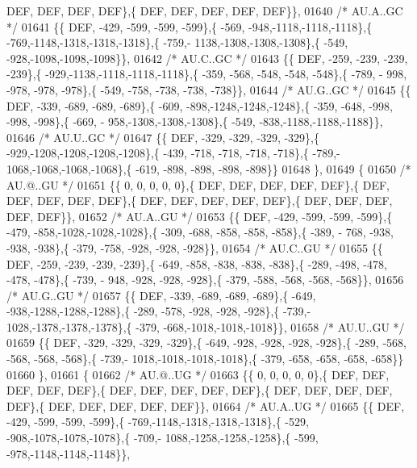 \begin{DoxyCode}
      DEF,  DEF,  DEF,  DEF\},\{  DEF,  DEF,  DEF,  DEF,  DEF\}\},
01640 \textcolor{comment}{/* AU.A..GC */}
01641 \{\{  DEF, -429, -599, -599, -599\},\{ -569, -948,-1118,-1118,-1118\},\{ -769,-1148,-1318,-1318,-1318\},\{ -759,-
      1138,-1308,-1308,-1308\},\{ -549, -928,-1098,-1098,-1098\}\},
01642 \textcolor{comment}{/* AU.C..GC */}
01643 \{\{  DEF, -259, -239, -239, -239\},\{ -929,-1138,-1118,-1118,-1118\},\{ -359, -568, -548, -548, -548\},\{ -789, -
      998, -978, -978, -978\},\{ -549, -758, -738, -738, -738\}\},
01644 \textcolor{comment}{/* AU.G..GC */}
01645 \{\{  DEF, -339, -689, -689, -689\},\{ -609, -898,-1248,-1248,-1248\},\{ -359, -648, -998, -998, -998\},\{ -669, -
      958,-1308,-1308,-1308\},\{ -549, -838,-1188,-1188,-1188\}\},
01646 \textcolor{comment}{/* AU.U..GC */}
01647 \{\{  DEF, -329, -329, -329, -329\},\{ -929,-1208,-1208,-1208,-1208\},\{ -439, -718, -718, -718, -718\},\{ -789,-
      1068,-1068,-1068,-1068\},\{ -619, -898, -898, -898, -898\}\}
01648 \},
01649 \{
01650 \textcolor{comment}{/* AU.@..GU */}
01651 \{\{    0,    0,    0,    0,    0\},\{  DEF,  DEF,  DEF,  DEF,  DEF\},\{  DEF,  DEF,  DEF,  DEF,  DEF\},\{  DEF,  
      DEF,  DEF,  DEF,  DEF\},\{  DEF,  DEF,  DEF,  DEF,  DEF\}\},
01652 \textcolor{comment}{/* AU.A..GU */}
01653 \{\{  DEF, -429, -599, -599, -599\},\{ -479, -858,-1028,-1028,-1028\},\{ -309, -688, -858, -858, -858\},\{ -389, -
      768, -938, -938, -938\},\{ -379, -758, -928, -928, -928\}\},
01654 \textcolor{comment}{/* AU.C..GU */}
01655 \{\{  DEF, -259, -239, -239, -239\},\{ -649, -858, -838, -838, -838\},\{ -289, -498, -478, -478, -478\},\{ -739, -
      948, -928, -928, -928\},\{ -379, -588, -568, -568, -568\}\},
01656 \textcolor{comment}{/* AU.G..GU */}
01657 \{\{  DEF, -339, -689, -689, -689\},\{ -649, -938,-1288,-1288,-1288\},\{ -289, -578, -928, -928, -928\},\{ -739,-
      1028,-1378,-1378,-1378\},\{ -379, -668,-1018,-1018,-1018\}\},
01658 \textcolor{comment}{/* AU.U..GU */}
01659 \{\{  DEF, -329, -329, -329, -329\},\{ -649, -928, -928, -928, -928\},\{ -289, -568, -568, -568, -568\},\{ -739,-
      1018,-1018,-1018,-1018\},\{ -379, -658, -658, -658, -658\}\}
01660 \},
01661 \{
01662 \textcolor{comment}{/* AU.@..UG */}
01663 \{\{    0,    0,    0,    0,    0\},\{  DEF,  DEF,  DEF,  DEF,  DEF\},\{  DEF,  DEF,  DEF,  DEF,  DEF\},\{  DEF,  
      DEF,  DEF,  DEF,  DEF\},\{  DEF,  DEF,  DEF,  DEF,  DEF\}\},
01664 \textcolor{comment}{/* AU.A..UG */}
01665 \{\{  DEF, -429, -599, -599, -599\},\{ -769,-1148,-1318,-1318,-1318\},\{ -529, -908,-1078,-1078,-1078\},\{ -709,-
      1088,-1258,-1258,-1258\},\{ -599, -978,-1148,-1148,-1148\}\},

\end{DoxyCode}
